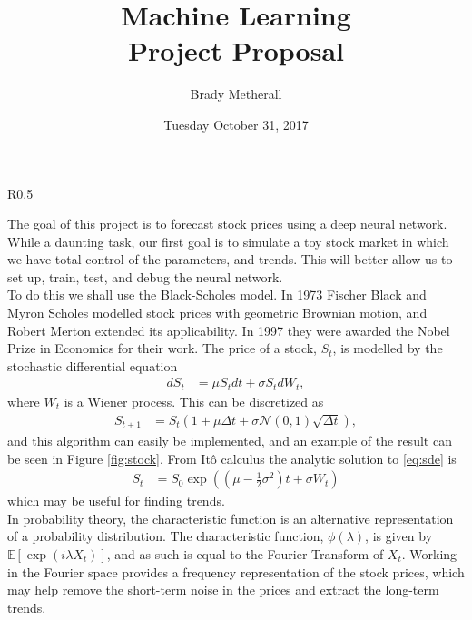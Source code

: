\documentclass[10pt]{article}
\title{Machine Learning \\ Project Proposal}
\author{Brady Metherall}
\date{Tuesday October 31, 2017}
\begin{document}
\maketitle

\begin{wrapfigure}{R}{0.5\textwidth}
\centering

\caption{Sample stock data generated from \eqref{eq:geobrown}.}
\label{fig:stock}
\end{wrapfigure}

The goal of this project is to forecast stock prices using a deep neural network. While a daunting task, our first goal is to simulate a toy stock market in which we have total control of the parameters, and trends. This will better allow us to set up, train, test, and debug the neural network. \\

To do this we shall use the Black-Scholes model. In 1973 Fischer Black and Myron Scholes modelled stock prices with geometric Brownian motion, and Robert Merton extended its applicability. In 1997 they were awarded the Nobel Prize in Economics for their work. The price of a stock, $S_t$, is modelled by the stochastic differential equation
\begin{align}
dS_t &= \mu S_t dt + \sigma S_t dW_t,
\label{eq:sde}
\end{align}
where $W_t$ is a Wiener process. This can be discretized as
\begin{align}
S_{t+1} &= S_t \left( 1 + \mu \Delta t + \sigma \mathcal{N}(0,1) \sqrt{\Delta t} \right),
\label{eq:geobrown}
\end{align}
and this algorithm can easily be implemented, and an example of the result can be seen in Figure \ref{fig:stock}. From It\^{o} calculus the analytic solution to \eqref{eq:sde} is
\begin{align*}
S_t &= S_0 \exp \left( \left( \mu - \frac{1}{2} \sigma^2 \right) t + \sigma W_t \right)
\end{align*}
which may be useful for finding trends. \\

In probability theory, the characteristic function is an alternative representation of a probability distribution. The characteristic function, $\phi (\lambda)$, is given by $\mathbb{E} [\exp( i \lambda X_t) ]$, and as such is equal to the Fourier Transform of $X_t$. Working in the Fourier space provides a frequency representation of the stock prices, which may help remove the short-term noise in the prices and extract the long-term trends. \\
\end{document}
